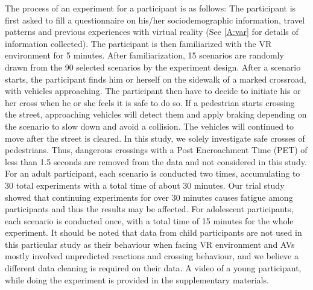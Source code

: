 The process of an experiment for a participant is as follows: The participant is first asked to fill a questionnaire on his/her sociodemographic information, travel patterns and previous experiences with virtual reality (See \cref{A:var} for details of information collected). The participant is then familiarized with the VR environment for 5 minutes. After familiarization, 15 scenarios are randomly drawn from the 90 selected scenarios by the experiment design. After a scenario starts, the participant finds him or herself on the sidewalk of a marked crossroad, with vehicles approaching. The participant then have to decide to initiate his or her cross when he or she feels it is safe to do so. If a pedestrian starts crossing the street, approaching vehicles will detect them and apply braking depending on the scenario to slow down and avoid a collision. The vehicles will continued to move after the street is cleared. In this study, we solely investigate safe crosses of pedestrians. Thus, dangerous crossings with a Post Encroachment Time (PET) of less than 1.5 seconds are removed from the data and not considered in this study. For an adult participant, each scenario is conducted two times, accumulating to 30 total experiments with a total time of about 30 minutes. Our trial study showed that continuing experiments for over 30 minutes causes fatigue among participants and thus the results may be affected. For adolescent participants, each scenario is conducted once, with a total time of 15 minutes for the whole experiment. It should be noted that data from child participants are not used in this particular study as their behaviour when facing VR environment and AVs mostly involved unpredicted reactions and crossing behaviour, and we believe a different data cleaning is required on their data. A video of a young participant, while doing the experiment is provided in the supplementary materials.
